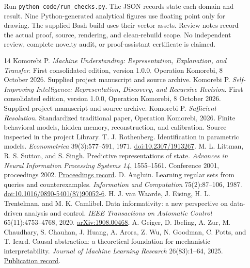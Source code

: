 \documentclass[11pt,letterpaper]{article}
\theoremstyle{plain}
\theoremstyle{definition}
\begin{document}
Run \texttt{python code/run\_checks.py}. The JSON records state each domain and result. Nine Python-generated analytical figures use floating point only for drawing. The supplied Bash build uses their vector assets. Review notes record the actual proof, source, rendering, and clean-rebuild scope. No independent review, complete novelty audit, or proof-assistant certificate is claimed.

\begin{thebibliography}{14}\fontsize{9.5}{11}\selectfont\setlength{\itemsep}{3pt}\setlength{\parskip}{0pt}
 Komorebi P. \emph{Machine Understanding: Representation, Explanation, and Transfer}. First consolidated edition, version 1.0.0, Operation Komorebi, 8 October 2026. Supplied project manuscript and source archive.
 Komorebi P. \emph{Self-Improving Intelligence: Representation, Discovery, and Recursive Revision}. First consolidated edition, version 1.0.0, Operation Komorebi, 8 October 2026. Supplied project manuscript and source archive.
 Komorebi P. \emph{Sufficient Resolution}. Standardized traditional paper, Operation Komorebi, 2026. Finite behavioral models, hidden memory, reconstruction, and calibration. Source inspected in the project Library.
 T. J. Rothenberg. Identification in parametric models. \emph{Econometrica} 39(3):577--591, 1971. \href{https://www.jstor.org/stable/1913267}{doi:10.2307/1913267}.
 M. L. Littman, R. S. Sutton, and S. Singh. Predictive representations of state. \emph{Advances in Neural Information Processing Systems 14}, 1555--1561. Conference 2001, proceedings 2002. \href{https://papers.nips.cc/paper_files/paper/2001/hash/1e4d36177d71bbb3558e43af9577d70e-Abstract.html}{Proceedings record}.
 D. Angluin. Learning regular sets from queries and counterexamples. \emph{Information and Computation} 75(2):87--106, 1987. \href{https://doi.org/10.1016/0890-5401(87)90052-6}{doi:10.1016/0890-5401(87)90052-6}.
 H. J. van Waarde, J. Eising, H. L. Trentelman, and M. K. Camlibel. Data informativity: a new perspective on data-driven analysis and control. \emph{IEEE Transactions on Automatic Control} 65(11):4753--4768, 2020. \href{https://arxiv.org/abs/1908.00468}{arXiv:1908.00468}.
 A. Geiger, D. Ibeling, A. Zur, M. Chaudhary, S. Chauhan, J. Huang, A. Arora, Z. Wu, N. Goodman, C. Potts, and T. Icard. Causal abstraction: a theoretical foundation for mechanistic interpretability. \emph{Journal of Machine Learning Research} 26(83):1--64, 2025. \href{https://jmlr.org/papers/v26/23-0058.html}{Publication record}.

\end{thebibliography}
\end{document}
